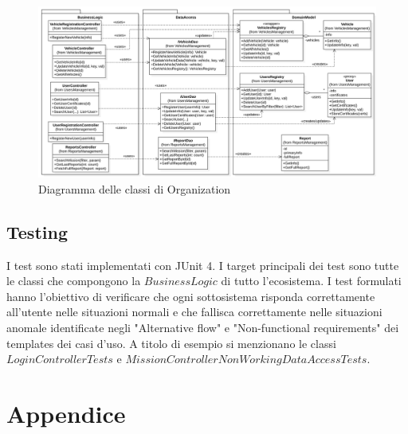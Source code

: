 \documentclass{article}
\begin{document}
    \begin{figure}[!h]
        \centering
        \includegraphics[width=6in]{diagrams/png/uml-organization.png}
        \caption{Diagramma delle classi di Organization}
        \label{fig:uml-organization}
    \end{figure}

    \newpage
    \subsection{Testing}
    I test sono stati implementati con JUnit 4.
    I target principali dei test sono tutte le classi che compongono la $BusinessLogic$ di tutto l'ecosistema.
    I test formulati hanno l'obiettivo di verificare che ogni sottosistema risponda correttamente all'utente nelle situazioni normali e che fallisca correttamente nelle situazioni
    anomale identificate negli "Alternative flow" e "Non-functional requirements" dei templates dei casi d'uso.
    A titolo di esempio si menzionano le classi $LoginControllerTests$ e \newline $MissionControllerNonWorkingDataAccessTests$.


    \section{Appendice}
\end{document}
